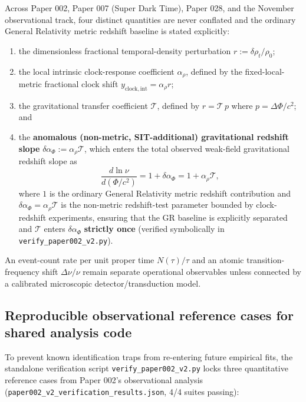 \documentclass[
  american,
  11pt,
  letterpaper,
]{article}
\providecommand{\tightlist}{%
  \setlength{\itemsep}{0pt}\setlength{\parskip}{0pt}}
\begin{document}
Across Paper 002, Paper 007 (Super Dark Time), Paper 028, and the November observational track, four distinct quantities are never conflated and the ordinary General Relativity metric redshift baseline is stated explicitly:

\begin{enumerate}
\def\labelenumi{\arabic{enumi}.}
\tightlist
\item
  the dimensionless fractional temporal-density perturbation \(r := \delta\rho_t / \rho_0\);
\item
  the local intrinsic clock-response coefficient \(\alpha_\rho\), defined by the fixed-local-metric fractional clock shift \(y_{\mathrm{clock,int}} = \alpha_\rho r\);
\item
  the gravitational transfer coefficient \(\mathcal{T}\), defined by \(r = \mathcal{T}\,p\) where \(p = \Delta\Phi / c^2\); and
\item
  the \textbf{anomalous (non-metric, SIT-additional) gravitational redshift slope} \(\delta\alpha_\Phi := \alpha_\rho \mathcal{T}\), which enters the total observed weak-field gravitational redshift slope as \begin{equation}
\frac{d\ln\nu}{d(\Phi/c^2)} = 1 + \delta\alpha_\Phi = 1 + \alpha_\rho \mathcal{T},
\end{equation} where \(1\) is the ordinary General Relativity metric redshift contribution and \(\delta\alpha_\Phi = \alpha_\rho\mathcal{T}\) is the non-metric redshift-test parameter bounded by clock-redshift experiments, ensuring that the GR baseline is explicitly separated and \(\mathcal{T}\) enters \(\delta\alpha_\Phi\) \textbf{strictly once} (verified symbolically in \nolinkurl{verify_paper002_v2.py}).
\end{enumerate}

An event-count rate per unit proper time \(N(\tau)/\tau\) and an atomic transition-frequency shift \(\Delta\nu/\nu\) remain separate operational observables unless connected by a calibrated microscopic detector/transduction model.

\subsection{Reproducible observational reference cases for shared analysis code}\label{reproducible-observational-reference-cases-for-shared-analysis-code}

To prevent known identification traps from re-entering future empirical fits, the standalone verification script \nolinkurl{verify_paper002_v2.py} locks three quantitative reference cases from Paper 002's observational analysis (\nolinkurl{paper002_v2_verification_results.json}, 4/4 suites passing):
\end{document}
